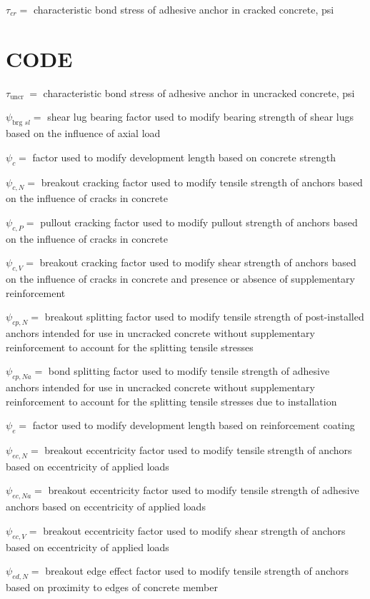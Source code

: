 \documentclass[10pt]{article}
\begin{document}
$\tau_{c r}=$ characteristic bond stress of adhesive anchor in cracked concrete, psi

\section*{CODE}
$\tau_{\text {uncr }}=$ characteristic bond stress of adhesive anchor in uncracked concrete, psi

$\psi_{\text {brg } s l}=$ shear lug bearing factor used to modify bearing strength of shear lugs based on the influence of axial load

$\psi_{c}=$ factor used to modify development length based on concrete strength

$\psi_{c, N}=$ breakout cracking factor used to modify tensile strength of anchors based on the influence of cracks in concrete

$\psi_{c, P}=$ pullout cracking factor used to modify pullout strength of anchors based on the influence of cracks in concrete

$\psi_{c, V}=$ breakout cracking factor used to modify shear strength of anchors based on the influence of cracks in concrete and presence or absence of supplementary reinforcement

$\psi_{c p, N}=$ breakout splitting factor used to modify tensile strength of post-installed anchors intended for use in uncracked concrete without supplementary reinforcement to account for the splitting tensile stresses

$\psi_{c p, N a}=$ bond splitting factor used to modify tensile strength of adhesive anchors intended for use in uncracked concrete without supplementary reinforcement to account for the splitting tensile stresses due to installation

$\psi_{e}=$ factor used to modify development length based on reinforcement coating

$\psi_{e c, N}=$ breakout eccentricity factor used to modify tensile strength of anchors based on eccentricity of applied loads

$\psi_{e c, N a}=$ breakout eccentricity factor used to modify tensile strength of adhesive anchors based on eccentricity of applied loads

$\psi_{e c, V}=$ breakout eccentricity factor used to modify shear strength of anchors based on eccentricity of applied loads

$\psi_{e d, N}=$ breakout edge effect factor used to modify tensile strength of anchors based on proximity to edges of concrete member
\end{document}
